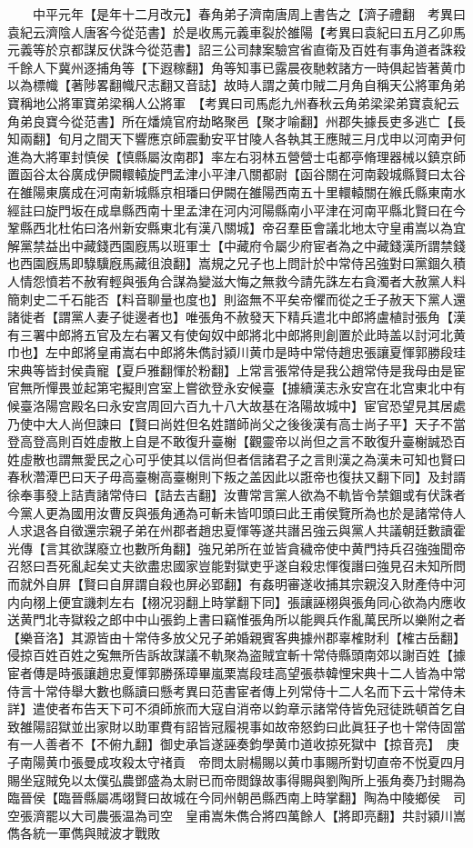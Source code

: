 　　中平元年【是年十二月改元】春角弟子濟南唐周上書告之【濟子禮翻　考異曰袁紀云濟陰人唐客今從范書】於是收馬元義車裂於雒陽【考異曰袁紀曰五月乙卯馬元義等於京都謀反伏誅今從范書】詔三公司隸案驗宫省直衛及百姓有事角道者誅殺千餘人下冀州逐捕角等【下遐稼翻】角等知事已露晨夜馳敕諸方一時俱起皆著黄巾以為標幟【著陟畧翻幟尺志翻又音誌】故時人謂之黄巾賊二月角自稱天公將軍角弟寶稱地公將軍寶弟梁稱人公將軍　【考異曰司馬彪九州春秋云角弟梁梁弟寶袁紀云角弟良寶今從范書】所在燔燒官府劫略聚邑【聚才喻翻】州郡失據長吏多逃亡【長知兩翻】旬月之間天下響應京師震動安平甘陵人各執其王應賊三月戊申以河南尹何進為大將軍封慎侯【慎縣屬汝南郡】率左右羽林五營營士屯都亭脩理器械以鎮京師置函谷太谷廣成伊闕轘轅旋門孟津小平津八關都尉【函谷關在河南穀城縣賢曰太谷在雒陽東廣成在河南新城縣京相璠曰伊闕在雒陽西南五十里轘轅關在緱氏縣東南水經註曰旋門坂在成臯縣西南十里孟津在河内河陽縣南小平津在河南平縣北賢曰在今鞏縣西北杜佑曰洛州新安縣東北有漢八關城】帝召羣臣會議北地太守皇甫嵩以為宜解黨禁益出中藏錢西園廐馬以班軍士【中藏府令屬少府宦者為之中藏錢漢所謂禁錢也西園廐馬即騄驥廐馬藏徂浪翻】嵩規之兄子也上問計於中常侍呂強對曰黨錮久積人情怨憤若不赦宥輕與張角合謀為變滋大悔之無救今請先誅左右貪濁者大赦黨人料簡刺史二千石能否【料音聊量也度也】則盜無不平矣帝懼而從之壬子赦天下黨人還諸徙者【謂黨人妻子徙邊者也】唯張角不赦發天下精兵遣北中郎將盧植討張角【漢有三署中郎將五官及左右署又有使匈奴中郎將北中郎將則創置於此時盖以討河北黄巾也】左中郎將皇甫嵩右中郎將朱儁討潁川黄巾是時中常侍趙忠張讓夏惲郭勝段珪宋典等皆封侯貴寵【夏戶雅翻惲於粉翻】上常言張常侍是我公趙常侍是我母由是宦官無所憚畏並起第宅擬則宫室上嘗欲登永安候臺【據續漢志永安宫在北宫東北中有候臺洛陽宫殿名曰永安宫周回六百九十八大故基在洛陽故城中】宦官恐望見其居處乃使中大人尚但諫曰【賢曰尚姓但名姓譜師尚父之後後漢有高士尚子平】天子不當登高登高則百姓虛散上自是不敢復升臺榭【觀靈帝以尚但之言不敢復升臺榭誠恐百姓虛散也謂無愛民之心可乎使其以信尚但者信諸君子之言則漢之為漢未可知也賢曰春秋濳潭巴曰天子毋高臺榭高臺榭則下叛之盖因此以誑帝也復扶又翻下同】及封諝徐奉事發上詰責諸常侍曰【詰去吉翻】汝曹常言黨人欲為不軌皆令禁錮或有伏誅者今黨人更為國用汝曹反與張角通為可斬未皆叩頭曰此王甫侯覽所為也於是諸常侍人人求退各自徵還宗親子弟在州郡者趙忠夏惲等遂共譖呂強云與黨人共議朝廷數讀霍光傳【言其欲謀廢立也數所角翻】強兄弟所在並皆貪穢帝使中黄門持兵召強強聞帝召怒曰吾死亂起矣丈夫欲盡忠國家豈能對獄吏乎遂自殺忠惲復譖曰強見召未知所問而就外自屛【賢曰自屏謂自殺也屏必郢翻】有姦明審遂收捕其宗親沒入財產侍中河内向栩上便宜譏刺左右【栩况羽翻上時掌翻下同】張讓誣栩與張角同心欲為内應收送黄門北寺獄殺之郎中中山張鈞上書曰竊惟張角所以能興兵作亂萬民所以樂附之者【樂音洛】其源皆由十常侍多放父兄子弟婚親賓客典據州郡辜榷財利【榷古岳翻】侵掠百姓百姓之寃無所告訴故謀議不軌聚為盗賊宜斬十常侍縣頭南郊以謝百姓【據宦者傳是時張讓趙忠夏惲郭勝孫璋畢嵐栗嵩段珪高望張恭韓悝宋典十二人皆為中常侍言十常侍舉大數也縣讀曰懸考異曰范書宦者傳上列常侍十二人名而下云十常侍未詳】遣使者布告天下可不須師旅而大寇自消帝以鈞章示諸常侍皆免冠徒跣頓首乞自致雒陽詔獄並出家財以助軍費有詔皆冠履視事如故帝怒鈞曰此眞狂子也十常侍固當有一人善者不【不俯九翻】御史承旨遂誣奏鈞學黄巾道收掠死獄中【掠音亮】　庚子南陽黄巾張曼成攻殺太守禇貢　帝問太尉楊賜以黄巾事賜所對切直帝不悦夏四月賜坐寇賊免以太僕弘農鄧盛為太尉已而帝閲錄故事得賜與劉陶所上張角奏乃封賜為臨晉侯【臨晉縣屬馮翊賢曰故城在今同州朝邑縣西南上時掌翻】陶為中陵鄉侯　司空張濟罷以大司農張温為司空　皇甫嵩朱儁合將四萬餘人【將即亮翻】共討潁川嵩儁各統一軍儁與賊波才戰敗